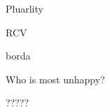 \documentclass[nooutcomes,noauthor]{ximera}
\author{Bart Snapp}
\begin{document}
\maketitle



\begin{exercise}
  Pluarlity
 
\end{exercise}




\begin{exercise}
  RCV
\end{exercise}




\begin{exercise}
  borda
\end{exercise}



\begin{exercise}
  Who is most unhappy?
\end{exercise}




\begin{exercise}
  ?????
\end{exercise}



\answerlistbox{}{}{}{}{}
\end{document}

